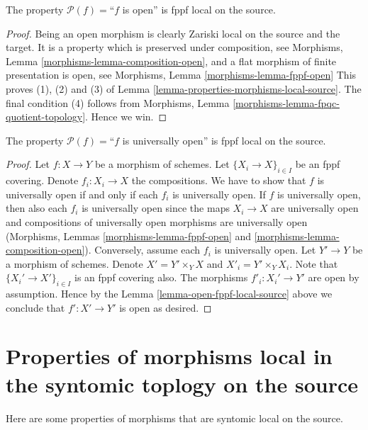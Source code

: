 \begin{lemma}
\label{lemma-open-fppf-local-source}
The property $\mathcal{P}(f)=$``$f$ is open''
is fppf local on the source.
\end{lemma}

\begin{proof}
Being an open morphism is clearly Zariski local on the source and the target.
It is a property which is preserved under composition, see
Morphisms, Lemma \ref{morphisms-lemma-composition-open}, and
a flat morphism of finite presentation is open, see
Morphisms, Lemma \ref{morphisms-lemma-fppf-open}
This proves
(1), (2) and (3) of Lemma \ref{lemma-properties-morphisms-local-source}.
The final condition (4) follows from
Morphisms, Lemma \ref{morphisms-lemma-fpqc-quotient-topology}.
Hence we win.
\end{proof}

\begin{lemma}
\label{lemma-universally-open-fppf-local-source}
The property $\mathcal{P}(f)=$``$f$ is universally open''
is fppf local on the source.
\end{lemma}

\begin{proof}
Let $f : X \to Y$ be a morphism of schemes.
Let $\{X_i \to X\}_{i \in I}$ be an fppf covering.
Denote $f_i : X_i \to X$ the compositions.
We have to show that $f$ is universally open if and only if
each $f_i$ is universally open. If $f$ is universally open,
then also each $f_i$ is universally open since the maps
$X_i \to X$ are universally open and compositions
of universally open morphisms are universally open
(Morphisms, Lemmas \ref{morphisms-lemma-fppf-open}
and \ref{morphisms-lemma-composition-open}).
Conversely, assume each $f_i$ is universally open.
Let $Y' \to Y$ be a morphism of schemes.
Denote $X' = Y' \times_Y X$ and $X'_i = Y' \times_Y X_i$.
Note that $\{X_i' \to X'\}_{i \in I}$ is an fppf covering also.
The morphisms $f'_i : X_i' \to Y'$ are open by assumption.
Hence by the Lemma \ref{lemma-open-fppf-local-source}
above we conclude that $f' : X' \to Y'$ is open as desired.
\end{proof}



\section{Properties of morphisms local in the syntomic toplogy on the source}
\label{section-syntomic-local-source}

\noindent
Here are some properties of morphisms that are syntomic local on the source.

